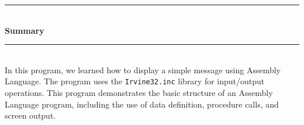 \documentclass[a4paper,12pt]{article}
\begin{document}
\rule{\textwidth}{1pt} \\[0.5cm]
    {\Large \textbf{Summary}}\\[0.2cm]
\rule{\textwidth}{1pt} \\[1.2cm]
In this program, we learned how to display a simple message using Assembly Language. 
The program uses the \texttt{Irvine32.inc} library for input/output operations. 
This program demonstrates the basic structure of an Assembly Language program, 
including the use of data definition, procedure calls, and screen output.
\end{document}
